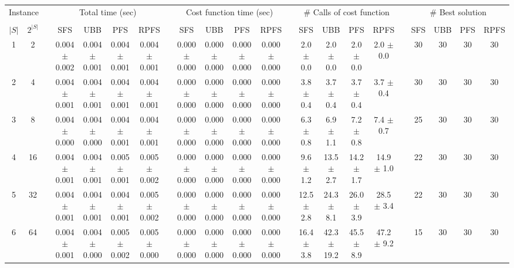 \documentclass[11pt]{article}
\begin{document}
\begin{landscape}
\begin{table}
\centering
\footnotesize
\begin{tabular}{cccccccccccccccccccccc}
\toprule
\multicolumn{2}{c}{Instance} & \phantom{} & \multicolumn{4}{c}{Total time (sec)}  & \phantom{} & \multicolumn{4}{c}{Cost function time (sec)}  & \phantom{} & \multicolumn{4}{c}{\# Calls of cost function}  & \phantom{} & \multicolumn{4}{c}{\# Best solution}\\
\cline{1-2}\cline{4-7}\cline{9-12}\cline{14-17}\cline{19-22}\\
$|S|$ & $2^{|S|}$ && SFS & UBB & PFS & RPFS && SFS & UBB & PFS & RPFS && SFS & UBB & PFS & RPFS && SFS & UBB & PFS & RPFS \\
 1 &       2 &&  0.004 $\pm$ 0.002 & 0.004 $\pm$ 0.001 & 0.004 $\pm$ 0.001 & 0.004 $\pm$ 0.001 &&  0.000 $\pm$ 0.000 & 0.000 $\pm$ 0.000 & 0.000 $\pm$ 0.000 & 0.000 $\pm$ 0.000 &&   2.0 $\pm$  0.0 &  2.0 $\pm$  0.0 &  2.0 $\pm$  0.0 &  2.0 $\pm$  0.0 && 30& 30& 30& 30\\
 2 &       4 &&  0.004 $\pm$ 0.001 & 0.004 $\pm$ 0.001 & 0.004 $\pm$ 0.001 & 0.004 $\pm$ 0.001 &&  0.000 $\pm$ 0.000 & 0.000 $\pm$ 0.000 & 0.000 $\pm$ 0.000 & 0.000 $\pm$ 0.000 &&   3.8 $\pm$  0.4 &  3.7 $\pm$  0.4 &  3.7 $\pm$  0.4 &  3.7 $\pm$  0.4 && 30& 30& 30& 30\\
 3 &       8 &&  0.004 $\pm$ 0.000 & 0.004 $\pm$ 0.000 & 0.004 $\pm$ 0.001 & 0.004 $\pm$ 0.001 &&  0.000 $\pm$ 0.000 & 0.000 $\pm$ 0.000 & 0.000 $\pm$ 0.000 & 0.000 $\pm$ 0.000 &&   6.3 $\pm$  0.8 &  6.9 $\pm$  1.1 &  7.2 $\pm$  0.8 &  7.4 $\pm$  0.7 && 25& 30& 30& 30\\
 4 &      16 &&  0.004 $\pm$ 0.001 & 0.004 $\pm$ 0.001 & 0.005 $\pm$ 0.001 & 0.005 $\pm$ 0.002 &&  0.000 $\pm$ 0.000 & 0.000 $\pm$ 0.000 & 0.000 $\pm$ 0.000 & 0.000 $\pm$ 0.000 &&   9.6 $\pm$  1.2 & 13.5 $\pm$  2.7 & 14.2 $\pm$  1.7 & 14.9 $\pm$  1.0 && 22& 30& 30& 30\\
 5 &      32 &&  0.004 $\pm$ 0.001 & 0.004 $\pm$ 0.001 & 0.004 $\pm$ 0.001 & 0.005 $\pm$ 0.002 &&  0.000 $\pm$ 0.000 & 0.000 $\pm$ 0.000 & 0.000 $\pm$ 0.000 & 0.000 $\pm$ 0.000 &&  12.5 $\pm$  2.8 & 24.3 $\pm$  8.1 & 26.0 $\pm$  3.9 & 28.5 $\pm$  3.4 && 22& 30& 30& 30\\
 6 &      64 &&  0.004 $\pm$ 0.001 & 0.004 $\pm$ 0.000 & 0.005 $\pm$ 0.002 & 0.005 $\pm$ 0.000 &&  0.000 $\pm$ 0.000 & 0.000 $\pm$ 0.000 & 0.000 $\pm$ 0.000 & 0.000 $\pm$ 0.000 &&  16.4 $\pm$  3.8 & 42.3 $\pm$ 19.2 & 45.5 $\pm$  8.9 & 47.2 $\pm$  9.2 && 15& 30& 30& 30\\

\end{tabular}
\end{table}
\end{landscape}
\end{document}
